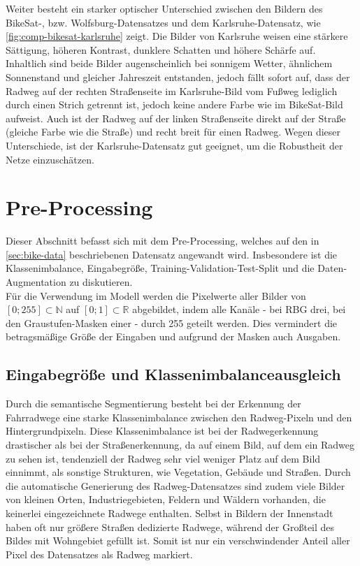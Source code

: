 Weiter besteht ein starker optischer Unterschied zwischen den Bildern des BikeSat-, bzw. Wolfsburg-Datensatzes 
und dem Karlsruhe-Datensatz, wie \autoref{fig:comp-bikesat-karlsruhe} zeigt. Die Bilder von Karlsruhe weisen
eine stärkere Sättigung, höheren Kontrast, dunklere Schatten und höhere Schärfe auf. Inhaltlich sind beide 
Bilder augenscheinlich bei sonnigem Wetter, ähnlichem Sonnenstand und gleicher Jahreszeit entstanden, jedoch 
fällt sofort auf, dass der Radweg auf der rechten Straßenseite im Karlsruhe-Bild vom Fußweg lediglich durch 
einen Strich getrennt ist, jedoch keine andere Farbe wie im BikeSat-Bild aufweist. Auch ist der Radweg auf 
der linken Straßenseite direkt auf der Straße (gleiche Farbe wie die Straße) und recht breit für einen Radweg.   
Wegen dieser Unterschiede, ist der Karlsruhe-Datensatz gut geeignet, um die Robustheit der Netze einzuschätzen. 


\section{Pre-Processing} \label{sec:pre-processing}

Dieser Abschnitt befasst sich mit dem Pre-Processing, welches auf den in \autoref{sec:bike-data} 
beschriebenen Datensatz angewandt wird. Insbesondere ist die Klassenimbalance, Eingabegröße, 
Training-Validation-Test-Split und die Daten-Augmentation zu diskutieren. \\
Für die Verwendung im Modell werden die Pixelwerte aller Bilder von $[0; 255] \subset \mathbb{N}$
auf $[0;1] \subset \mathbb{R}$ abgebildet, indem alle Kanäle - bei RBG drei, bei den Graustufen-Masken einer - durch 255 geteilt werden.
Dies vermindert die betragsmäßige Größe der Eingaben und aufgrund der Masken auch Ausgaben. 

\subsection{Eingabegröße und Klassenimbalanceausgleich}

Durch die semantische Segmentierung besteht bei der Erkennung der Fahrradwege eine starke 
Klassenimbalance zwischen den Radweg-Pixeln und den Hintergrundpixeln. Diese Klassenimbalance ist bei der Radwegerkennung drastischer 
als bei der Straßenerkennung, da auf einem Bild, auf dem ein Radweg zu sehen ist, 
tendenziell der Radweg sehr viel weniger Platz auf dem Bild einnimmt, als sonstige Strukturen, wie Vegetation, Gebäude und Straßen. 
Durch die automatische Generierung des Radweg-Datensatzes sind zudem viele Bilder von kleinen Orten,
Industriegebieten, Feldern und Wäldern vorhanden, die keinerlei eingezeichnete Radwege enthalten. 
Selbst in Bildern der Innenstadt haben oft nur größere Straßen dedizierte Radwege, während der 
Großteil des Bildes mit Wohngebiet gefüllt ist. 
Somit ist nur ein verschwindender Anteil aller Pixel des Datensatzes als Radweg markiert. 


